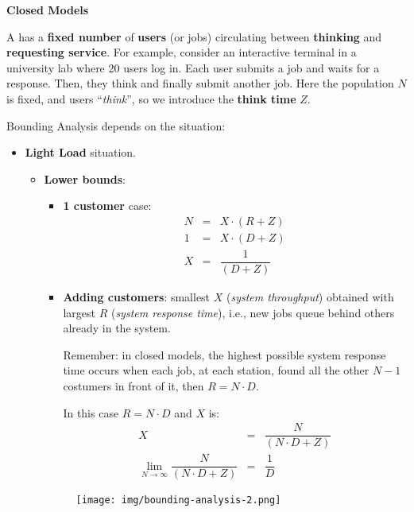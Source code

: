 \newpage

\begin{flushleft}
	\textcolor{Red2}{\textbf{Closed Models}}
\end{flushleft}
A  has a \textbf{fixed number} of \textbf{users} (or jobs) circulating between \textbf{thinking} and \textbf{requesting service}. For example, consider an interactive terminal in a university lab where 20 users log in. Each user submits a job and waits for a response. Then, they think and finally submit another job. Here the population $N$ is fixed, and users ``\emph{think}'', so we introduce the \textbf{think time} $Z$.

\highspace
Bounding Analysis depends on the situation:
\begin{itemize}
	\item \textbf{Light Load} situation.
	\begin{itemize}
		\item \textbf{Lower bounds}:
		\begin{itemize}
			\item \textbf{1 customer} case:
			\begin{equation}
				\begin{array}{rcl}
					N &=& X \cdot \left(R+Z\right) \\ [.5em]
					1 &=& X \cdot \left(D+Z\right) \\ [.5em]
					X &=& \dfrac{1}{\left(D+Z\right)}
				\end{array}
			\end{equation}

			\item \textbf{Adding customers}: smallest $X$ (\emph{system throughput}) obtained with largest $R$ (\emph{system response time}), i.e., new jobs queue behind others already in the system.
			
			\label{eq: lower bound for light load}
			Remember: in closed models, the highest possible system response time occurs when each job, at each station, found all the other $N-1$ costumers in front of it, then $R = N \cdot D$.

			In this case $R = N \cdot D$ and $X$ is:
			\begin{equation}
				\begin{array}{rcl}
					X &=& \dfrac{N}{\left(N \cdot D + Z\right)} \\ [1em]
					\lim\limits_{N \rightarrow \infty} \dfrac{N}{\left(N \cdot D + Z\right)} &=& \dfrac{1}{D}
				\end{array}
			\end{equation}
		\end{itemize}
		\begin{figure}[!htp]
			\centering
			\texttt{[image: img/bounding-analysis-2.png]}
		\end{figure}



\end{itemize}
\end{itemize}
